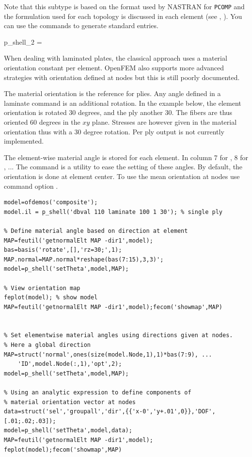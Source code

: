 Note that this subtype is based on the format used by NASTRAN for {\tt PCOMP} and the formulation used for each topology is discussed in each element (see \quada, \triaa). You can use the  commands to generate standard entries.

\begin{eqsvg}{p_shell_2}
 =  
\end{eqsvg}


When dealing with laminated plates, the classical approach uses a material orientation constant per element. OpenFEM also supports more advanced strategies with orientation defined at nodes but this is still poorly documented.

The material orientation is the reference for plies. Any angle defined in a laminate command is an additional rotation. In the example below, the element orientation is rotated 30 degrees, and the ply another 30. The fibers are thus oriented 60 degrees in the $xy$ plane. Stresses are however given in the material orientation thus with a 30 degree rotation. Per ply output is not currently implemented. 

The element-wise material angle is stored for each element. In column 7 for \triaa, 8 for \quada, ...  The  command is a utility to ease the setting of these angles. By default, the orientation is done at element center. To use the mean orientation at nodes use command option .

\begin{verbatim}
model=ofdemos('composite');
model.il = p_shell('dbval 110 laminate 100 1 30'); % single ply

% Define material angle based on direction at element
MAP=feutil('getnormalElt MAP -dir1',model);
bas=basis('rotate',[],'rz=30;',1);
MAP.normal=MAP.normal*reshape(bas(7:15),3,3)';
model=p_shell('setTheta',model,MAP);

% View orientation map
feplot(model); % show model
MAP=feutil('getnormalElt MAP -dir1',model);fecom('showmap',MAP)


% Set elementwise material angles using directions given at nodes. 
% Here a global direction
MAP=struct('normal',ones(size(model.Node,1),1)*bas(7:9), ...
    'ID',model.Node(:,1),'opt',2);
model=p_shell('setTheta',model,MAP);

% Using an analytic expression to define components of 
% material orientation vector at nodes
data=struct('sel','groupall','dir',{{'x-0','y+.01',0}},'DOF',[.01;.02;.03]);
model=p_shell('setTheta',model,data);
MAP=feutil('getnormalElt MAP -dir1',model);
feplot(model);fecom('showmap',MAP)
\end{verbatim}

